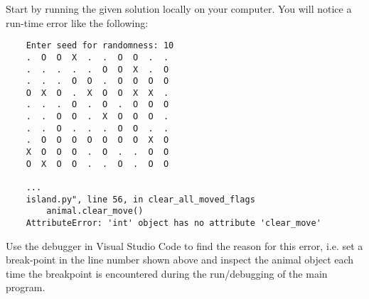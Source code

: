 
Start by running the given solution locally on your computer.
You will notice a run-time error like the following:

\begin{verbatim}
    Enter seed for randomness: 10
    .  O  O  X  .  .  O  O  .  .  
    .  .  .  .  .  O  O  X  .  O  
    .  .  .  O  O  .  O  O  O  O  
    O  X  O  .  X  O  O  X  X  .  
    .  .  .  O  .  O  .  O  O  O  
    .  .  O  O  .  X  O  O  O  .  
    .  .  O  .  .  .  O  O  .  .  
    .  O  O  O  O  O  O  O  X  O  
    X  O  O  O  .  O  .  .  O  O  
    O  X  O  O  .  .  O  .  O  O

    ...
    island.py", line 56, in clear_all_moved_flags
        animal.clear_move()
    AttributeError: 'int' object has no attribute 'clear_move'
\end{verbatim}

Use the debugger in Visual Studio Code to find the reason for this error,
i.e. set a break-point in the line number shown above
and inspect the animal object each time the breakpoint is encountered during the run/debugging of the main program.
